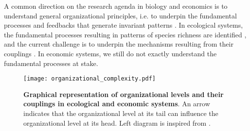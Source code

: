 % 
A common direction on the research agenda in biology and economics is to understand general organizational principles, i.e.  to underpin the fundamental processes and feedbacks that generate invariant patterns \citep{Levin2002,Olff2009,Veldhuis2018}.
% 
In ecological systems, the fundamental processes resulting in patterns of species richness are identified \citep{Rahbek2019a,Rangel2018,Hagen2022}, and the current challenge is to underpin the mechanisms resulting from their couplings \citep{Hagen2022}.
% 
In economic systems, we still do not exactly understand the fundamental processes at stake. 
% 
% 
% 

\begin{figure}[ht]
    \centering
    \texttt{[image: organizational\_complexity.pdf]}
\caption{\textbf{Graphical representation of organizational levels and their couplings in ecological and economic systems}. An arrow indicates that the organizational level at its tail can influence the organizational level at its head. Left diagram is inspired from \cite{Hendry+2016}.}
\label{fig:organisational_levels}
\end{figure}





